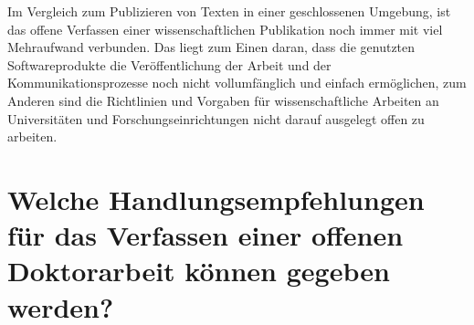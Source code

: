 Im Vergleich zum Publizieren von Texten in einer geschlossenen Umgebung, ist das offene Verfassen einer wissenschaftlichen Publikation noch immer mit viel Mehraufwand verbunden. Das liegt zum Einen daran, dass die genutzten Softwareprodukte die Veröffentlichung der Arbeit und der Kommunikationsprozesse noch nicht vollumfänglich und einfach ermöglichen, zum Anderen sind die Richtlinien und Vorgaben für wissenschaftliche Arbeiten an Universitäten und Forschungseinrichtungen nicht darauf ausgelegt offen zu arbeiten.

\section{Welche Handlungsempfehlungen für das Verfassen einer offenen Doktorarbeit können gegeben werden?}
